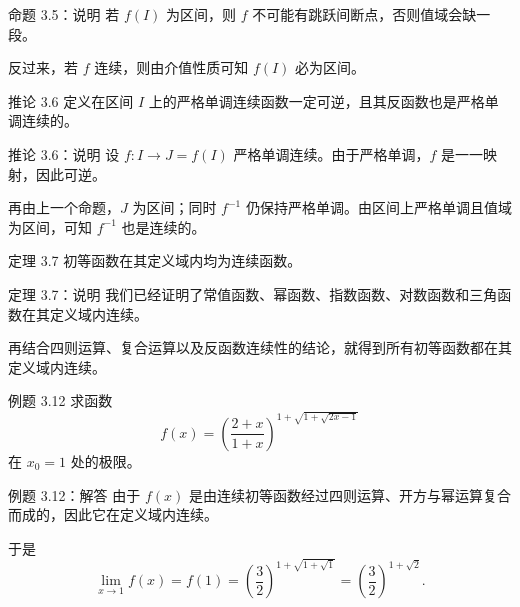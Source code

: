 ﻿\documentclass[aspectratio=169,11pt]{ctexbeamer}
\begin{document}
\begin{frame}{命题 3.5：说明}
若 $f(I)$ 为区间，则 $f$ 不可能有跳跃间断点，否则值域会缺一段。

\vspace{0.6em}
反过来，若 $f$ 连续，则由介值性质可知 $f(I)$ 必为区间。
\end{frame}

\begin{frame}{推论 3.6}
定义在区间 $I$ 上的严格单调连续函数一定可逆，且其反函数也是严格单调连续的。
\end{frame}

\begin{frame}{推论 3.6：说明}
设 $f:I\to J=f(I)$ 严格单调连续。由于严格单调，$f$ 是一一映射，因此可逆。

\vspace{0.6em}
再由上一个命题，$J$ 为区间；同时 $f^{-1}$ 仍保持严格单调。由区间上严格单调且值域为区间，可知 $f^{-1}$ 也是连续的。
\end{frame}

\begin{frame}{定理 3.7}
初等函数在其定义域内均为连续函数。
\end{frame}

\begin{frame}{定理 3.7：说明}
我们已经证明了常值函数、幂函数、指数函数、对数函数和三角函数在其定义域内连续。

\vspace{0.6em}
再结合四则运算、复合运算以及反函数连续性的结论，就得到所有初等函数都在其定义域内连续。
\end{frame}

\begin{frame}{例题 3.12}
求函数
\[
f(x)=\left(\frac{2+x}{1+x}\right)^{1+\sqrt{1+\sqrt{2x-1}}}
\]
在 $x_0=1$ 处的极限。
\end{frame}

\begin{frame}{例题 3.12：解答}
由于 $f(x)$ 是由连续初等函数经过四则运算、开方与幂运算复合而成的，因此它在定义域内连续。

\vspace{0.6em}
于是
\[
  \lim_{x\to 1}f(x)=f(1)
  =
  \left(\frac{3}{2}\right)^{1+\sqrt{1+\sqrt{1}}}
  =
  \left(\frac{3}{2}\right)^{1+\sqrt2}.
\]
\end{frame}
\end{document}
